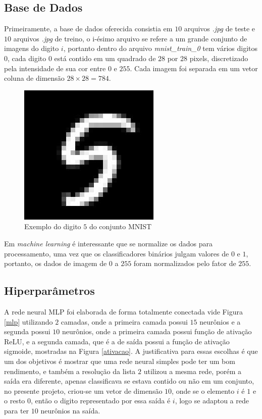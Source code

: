 \subsection{Base de Dados}

Primeiramente, a base de dados oferecida consistia em $10$ arquivos \textit{.jpg} de teste e $10$ arquivos \textit{.jpg} de treino, o i-ésimo arquivo se refere a um grande conjunto de imagens do digito $i$, portanto dentro do arquivo \textit{mnist\_train\_0} tem vários digitos $0$, cada digito $0$ está contido em um quadrado de $28$ por $28$ pixels, discretizado pela intensidade de sua cor entre $0$ e $255$. Cada imagem foi separada em um vetor coluna de dimensão $28\times28 = 784$.

\begin{figure}[!h]
    \centering
    \includegraphics[scale=0.4]{Imagens/digito5.jpg}
    \caption{Exemplo do digito $5$ do conjunto MNIST}
    \label{fig:5}
\end{figure}

Em \textit{machine learning} é interessante que se normalize os dados para processamento, uma vez que os classificadores binários julgam valores de $0$ e $1$, portanto, os dados de imagem de $0$ a $255$ foram normalizados pelo fator de $255$.

\subsection{Hiperparâmetros}

A rede neural MLP foi elaborada de forma totalmente conectada vide Figura \ref{mlp} utilizando $2$ camadas, onde a primeira camada possui $15$ neurônios e a segunda possui $10$ neurônios, onde a primeira camada possui função de ativação ReLU, e a segunda camada, que é a de saída possui a função de ativação sigmoide, mostradas na Figura \ref{ativacao}. A justificativa para essas escolhas é que um dos objetivos é mostrar que uma rede neural simples pode ter um bom rendimento, e também a resolução da lista $2$ utilizou a mesma rede, porém a saída era diferente, apenas classificava se estava contido ou não em um conjunto, no presente projeto, criou-se um vetor de dimensão $10$, onde se o elemento $i$ é $1$ e o resto $0$, então o digito representado por essa saída é $i$, logo se adaptou a rede para ter $10$ neurônios na saída. 

